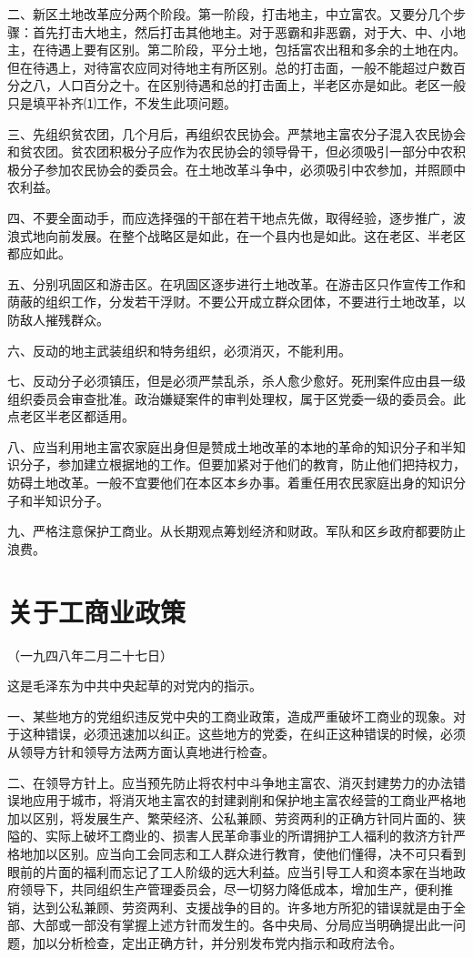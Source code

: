 \documentclass[UTF-8, a5paper, 12pt]{ctexart}
\begin{document}
二、新区土地改革应分两个阶段。第一阶段，打击地主，中立富农。又要分几个步骤：首先打击大地主，然后打击其他地主。对于恶霸和非恶霸，对于大、中、小地主，在待遇上要有区别。第二阶段，平分土地，包括富农出租和多余的土地在内。但在待遇上，对待富农应同对待地主有所区别。总的打击面，一般不能超过户数百分之八，人口百分之十。在区别待遇和总的打击面上，半老区亦是如此。老区一般只是填平补齐⑴工作，不发生此项问题。

三、先组织贫农团，几个月后，再组织农民协会。严禁地主富农分子混入农民协会和贫农团。贫农团积极分子应作为农民协会的领导骨干，但必须吸引一部分中农积极分子参加农民协会的委员会。在土地改革斗争中，必须吸引中农参加，并照顾中农利益。

四、不要全面动手，而应选择强的干部在若干地点先做，取得经验，逐步推广，波浪式地向前发展。在整个战略区是如此，在一个县内也是如此。这在老区、半老区都应如此。

五、分别巩固区和游击区。在巩固区逐步进行土地改革。在游击区只作宣传工作和荫蔽的组织工作，分发若干浮财。不要公开成立群众团体，不要进行土地改革，以防敌人摧残群众。

六、反动的地主武装组织和特务组织，必须消灭，不能利用。

七、反动分子必须镇压，但是必须严禁乱杀，杀人愈少愈好。死刑案件应由县一级组织委员会审查批准。政治嫌疑案件的审判处理权，属于区党委一级的委员会。此点老区半老区都适用。

八、应当利用地主富农家庭出身但是赞成土地改革的本地的革命的知识分子和半知识分子，参加建立根据地的工作。但要加紧对于他们的教育，防止他们把持权力，妨碍土地改革。一般不宜要他们在本区本乡办事。着重任用农民家庭出身的知识分子和半知识分子。

九、严格注意保护工商业。从长期观点筹划经济和财政。军队和区乡政府都要防止浪费。

\section{关于工商业政策}

（一九四八年二月二十七日）

这是毛泽东为中共中央起草的对党内的指示。

一、某些地方的党组织违反党中央的工商业政策，造成严重破坏工商业的现象。对于这种错误，必须迅速加以纠正。这些地方的党委，在纠正这种错误的时候，必须从领导方针和领导方法两方面认真地进行检查。

二、在领导方针上。应当预先防止将农村中斗争地主富农、消灭封建势力的办法错误地应用于城市，将消灭地主富农的封建剥削和保护地主富农经营的工商业严格地加以区别，将发展生产、繁荣经济、公私兼顾、劳资两利的正确方针同片面的、狭隘的、实际上破坏工商业的、损害人民革命事业的所谓拥护工人福利的救济方针严格地加以区别。应当向工会同志和工人群众进行教育，使他们懂得，决不可只看到眼前的片面的福利而忘记了工人阶级的远大利益。应当引导工人和资本家在当地政府领导下，共同组织生产管理委员会，尽一切努力降低成本，增加生产，便利推销，达到公私兼顾、劳资两利、支援战争的目的。许多地方所犯的错误就是由于全部、大部或一部没有掌握上述方针而发生的。各中央局、分局应当明确提出此一问题，加以分析检查，定出正确方针，并分别发布党内指示和政府法令。
\end{document}
